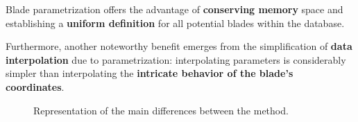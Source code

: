 Blade parametrization offers the advantage of \textbf{conserving memory} space and establishing a \textbf{uniform definition} for all potential blades within the database.

Furthermore, another noteworthy benefit emerges from the simplification of \textbf{data interpolation} due to parametrization: interpolating parameters is considerably simpler than interpolating the \textbf{intricate behavior of the blade's coordinates}.

\begin{figure}[!h]
    \centering
    
    \caption{Representation of the main differences between the method.} 
    \label{fig:framework}
\end{figure}

